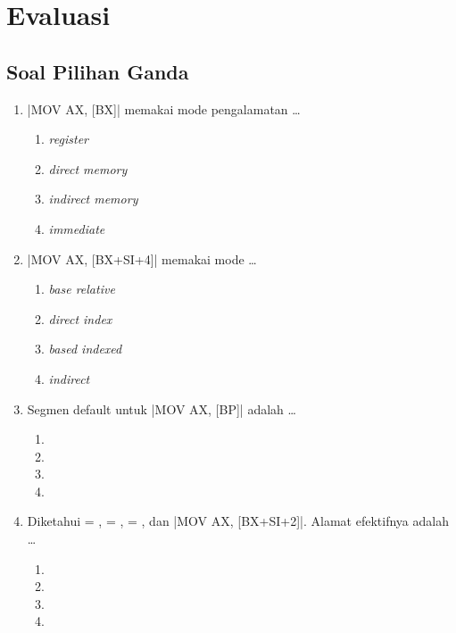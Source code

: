 \section{Evaluasi}
\label{sec:evaluasi-bab12}

\subsection{Soal Pilihan Ganda}

\begin{enumerate}
    \item \lstasm|MOV AX, [BX]| memakai mode pengalamatan \dots
          \begin{enumerate}
              \item \textit{register}
              \item \textit{direct memory}
              \item \textit{indirect memory}
              \item \textit{immediate}
          \end{enumerate}

    \item \lstasm|MOV AX, [BX+SI+4]| memakai mode \dots
          \begin{enumerate}
              \item \textit{base relative}
              \item \textit{direct index}
              \item \textit{based indexed}
              \item \textit{indirect}
          \end{enumerate}

    \item Segmen default untuk \lstasm|MOV AX, [BP]| adalah \dots
          \begin{enumerate}
              \item {} \item {}
              \item {} \item {}
          \end{enumerate}

    \item Diketahui  = ,  = ,
           = , dan \lstasm|MOV AX, [BX+SI+2]|.
          Alamat efektifnya adalah \dots
          \begin{enumerate}
              \item {} \item {}
              \item {} \item {}
          \end{enumerate}


\end{enumerate}
